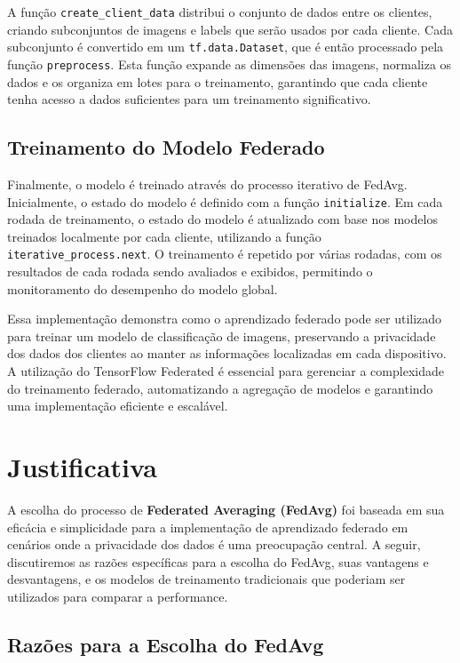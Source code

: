 A função \texttt{create\_client\_data} distribui o conjunto de dados entre os clientes, criando subconjuntos de imagens e labels que serão usados por cada cliente. Cada subconjunto é convertido em um \texttt{tf.data.Dataset}, que é então processado pela função \texttt{preprocess}. Esta função expande as dimensões das imagens, normaliza os dados e os organiza em lotes para o treinamento, garantindo que cada cliente tenha acesso a dados suficientes para um treinamento significativo.

\subsection{Treinamento do Modelo Federado}

Finalmente, o modelo é treinado através do processo iterativo de FedAvg. Inicialmente, o estado do modelo é definido com a função \texttt{initialize}. Em cada rodada de treinamento, o estado do modelo é atualizado com base nos modelos treinados localmente por cada cliente, utilizando a função \texttt{iterative\_process.next}. O treinamento é repetido por várias rodadas, com os resultados de cada rodada sendo avaliados e exibidos, permitindo o monitoramento do desempenho do modelo global.

Essa implementação demonstra como o aprendizado federado pode ser utilizado para treinar um modelo de classificação de imagens, preservando a privacidade dos dados dos clientes ao manter as informações localizadas em cada dispositivo. A utilização do TensorFlow Federated é essencial para gerenciar a complexidade do treinamento federado, automatizando a agregação de modelos e garantindo uma implementação eficiente e escalável.

\section{Justificativa}

A escolha do processo de \textbf{Federated Averaging (FedAvg)} foi baseada em sua eficácia e simplicidade para a implementação de aprendizado federado em cenários onde a privacidade dos dados é uma preocupação central. A seguir, discutiremos as razões específicas para a escolha do FedAvg, suas vantagens e desvantagens, e os modelos de treinamento tradicionais que poderiam ser utilizados para comparar a performance.

\subsection{Razões para a Escolha do FedAvg}

